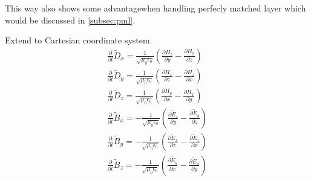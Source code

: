 This way also shows some advantagewhen handling perfecly matched layer which would be discussed in \ref{subsec:pml}.

Extend to Cartesian coordinate system.
\begin{gather}
  \frac{\partial}{\partial t}\widetilde{D}_x = \frac{1}{\sqrt{\mu_0\epsilon_0}}\left(\frac{\partial H_z}{\partial y} - \frac{\partial H_y}{\partial z}\right)\label{eq:up_d_x}\\
  \frac{\partial}{\partial t}\widetilde{D}_y = \frac{1}{\sqrt{\mu_0\epsilon_0}}\left(\frac{\partial H_x}{\partial z} - \frac{\partial H_z}{\partial x}\right)\label{eq:up_d_y}\\
  \frac{\partial}{\partial t}\widetilde{D}_z = \frac{1}{\sqrt{\mu_0\epsilon_0}}\left(\frac{\partial H_y}{\partial x} - \frac{\partial H_x}{\partial y}\right)\label{eq:up_d_z}\\
  \frac{\partial}{\partial t}\widetilde{B}_x =-\frac{1}{\sqrt{\mu_0\epsilon_0}}\left(\frac{\partial \widetilde{E}_z}{\partial y} - \frac{\partial \widetilde{E}_y}{\partial z}\right)\label{eq:up_b_x}\\
  \frac{\partial}{\partial t}\widetilde{B}_y =-\frac{1}{\sqrt{\mu_0\epsilon_0}}\left(\frac{\partial \widetilde{E}_x}{\partial z} - \frac{\partial \widetilde{E}_z}{\partial x}\right)\label{eq:up_b_y}\\
  \frac{\partial}{\partial t}\widetilde{B}_z =-\frac{1}{\sqrt{\mu_0\epsilon_0}}\left(\frac{\partial \widetilde{E}_y}{\partial x} - \frac{\partial \widetilde{E}_x}{\partial y}\right)\label{eq:up_b_z}
\end{gather}


